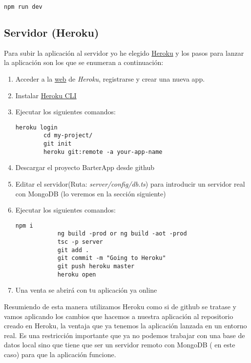 	\lstset{language=C, breaklines=true, basicstyle=\footnotesize}
		\begin{lstlisting}[frame=single]
		npm run dev
    	\end{lstlisting}

\subsection{Servidor (Heroku)}
Para subir la aplicación al servidor yo he elegido \hyperlink{https://www.heroku.com/}{Heroku} y los pasos para lanzar la aplicación son los que se enumeran a continuación:

\begin{enumerate}
	\item Acceder a la \hyperlink{https://www.heroku.com/}{web} de \emph{Heroku}, registrarse y crear una nueva app.
	\item Instalar \hyperlink{https://devcenter.heroku.com/articles/heroku-cli}{Heroku CLI}
	\item Ejecutar los siguientes comandos:
		\lstset{language=C, breaklines=true, basicstyle=\footnotesize}
		\begin{lstlisting}[frame=single]
		heroku login
		cd my-project/
		git init
		heroku git:remote -a your-app-name
    	\end{lstlisting}
	\item Descargar el proyecto BarterApp desde github 
	\item Editar el servidor(Ruta: \emph{server/config/db.ts}) para introducir un servidor real con MongoDB (lo veremos en la sección siguiente)
	\item Ejecutar los siguientes comandos:
		\lstset{language=C, breaklines=true, basicstyle=\footnotesize}
		\begin{lstlisting}[frame=single]
			npm i
			ng build -prod or ng build -aot -prod
			tsc -p server
			git add .
			git commit -m "Going to Heroku"
			git push heroku master
			heroku open
    	\end{lstlisting}
	\item Una venta se abrirá con tu aplicación ya online
\end{enumerate}

Resumiendo de esta manera utilizamos Heroku como si de github se tratase y vamos aplicando los cambios que hacemos a nuestra aplicación al repositorio creado en Heroku, la ventaja que ya tenemos la aplicación lanzada en un entorno real. Es una restricción importante que ya no podemos trabajar con una base de datos local sino que tiene que ser un servidor remoto con MongoDB ( en este caso) para que la aplicación funcione.
	

